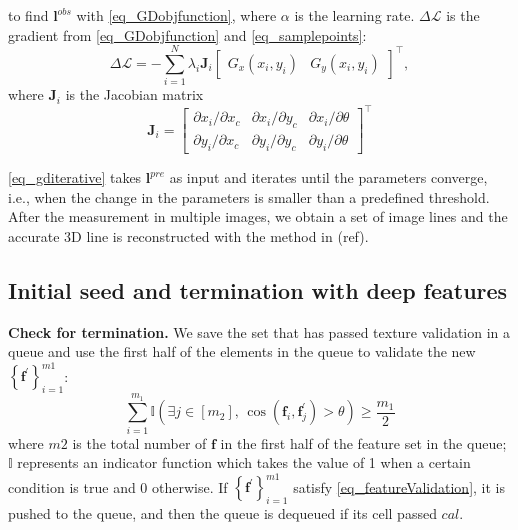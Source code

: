 to find $\mathbf{l}^{obs}$ with \cref{eq_GDobjfunction},
where \( \alpha \) is the learning rate.
\( \Delta \mathcal{L} \) is the gradient from \cref{eq_GDobjfunction} and \cref{eq_samplepoints}:
\begin{equation}
\Delta \mathcal{L} = - \sum_{i=1}^{N} \lambda_i \mathbf{J}_i
\begin{bmatrix}
G_x(x_i, y_i) &
G_y(x_i, y_i)
\end{bmatrix}^{\top},
\end{equation}
where $\mathbf{J}_i$ is the Jacobian matrix
\begin{equation}
\mathbf{J}_i=
\begin{bmatrix}
\partial x_i / \partial x_c & \partial x_i / \partial y_c & \partial x_i / \partial \theta \\
\partial y_i / \partial x_c & \partial y_i / \partial y_c & \partial y_i / \partial \theta
\end{bmatrix}^{\top}
\end{equation}

\cref{eq_gditerative} takes $\mathbf{l}^{pre}$ as input and iterates until the parameters converge, i.e., when the change in the parameters is smaller than a predefined threshold.
After the measurement in multiple images, 
we obtain a set of image lines and the accurate 3D line is reconstructed with the method in (ref).

\subsection{Initial seed and termination with deep features}


\textbf{Check for termination.} We save the set that has passed texture validation in a queue and use the first half of the elements in the queue to validate the new $\left\{\mathbf f^\prime\right\}_{i=1}^{m1}$:
\begin{equation}
\sum_{i=1}^{m_1} \mathbb{I} \left( \exists j \in \left[ m_2 \right], \, \cos \left( \mathbf{f}_i, \mathbf f^{\prime}_j \right) > \theta \right) \geq \frac{m_1}{2}
\label{eq_featureValidation}
\end{equation}
where $m2$ is the total number of $\mathbf f$ in the first half of the feature set in the queue;
$\mathbb{I}$ represents an indicator function which takes the value of 1 when a certain condition is true and 0 otherwise.
If $\left\{\mathbf f^\prime\right\}_{i=1}^{m1}$ satisfy \cref{eq_featureValidation},
it is pushed to the queue, 
and then the queue is dequeued if its cell passed $cal$.

